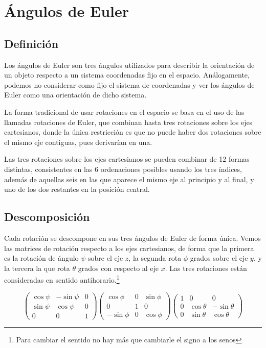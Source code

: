 \documentclass{article}
\theoremstyle{plain}
\theoremstyle{definition}
\theoremstyle{remark}
\begin{document}
\section{Ángulos de Euler}
\subsection{Definición}

Los ángulos de Euler son tres ángulos utilizados para describir la orientación de un objeto respecto a un sistema
coordenadas fijo en el espacio. Análogamente, podemos no considerar como fijo el sistema de coordenadas y ver
los ángulos de Euler como una orientación de dicho sistema.

La forma tradicional de usar rotaciones en el espacio se basa en el uso de las llamadas rotaciones de Euler,
que combinan hasta tres rotaciones sobre los ejes cartesianos, donde la única restricción es que no puede
haber dos rotaciones sobre el mismo eje contiguas, pues derivarían en una.

Las tres rotaciones sobre los ejes cartesianos se pueden combinar de 12 formas distintas, consistentes en
las 6 ordenaciones posibles usando los tres índices, además de aquellas seis en las que aparece el mismo
eje al principio y al final, y uno de los dos restantes en la posición central.


\subsection{Descomposición}
Cada rotación se descompone en sus tres ángulos de Euler de forma única. Vemos las matrices de rotación
respecto a los ejes cartesianos, de forma que la primera es la rotación de ángulo $\psi$ sobre el
eje $z$, la segunda rota $\phi$ grados sobre el eje $y$, y la tercera la que rota $\theta$ grados con respecto
al eje $x$. Las tres rotaciones están consideradas en sentido antihorario.\footnote{Para cambiar el sentido no hay más que cambiarle el signo a los senos}

\[\begin{pmatrix}
    \cos \psi & -\sin \psi & 0 \\
    \sin \psi & \cos \psi & 0 \\
    0 & 0 & 1
  \end{pmatrix}\begin{pmatrix}
      \cos \phi & 0 & \sin \phi \\
      0 & 1 & 0 \\
      -\sin \phi & 0 & \cos \phi
    \end{pmatrix}\begin{pmatrix}
    1 & 0 & 0 \\
    0 & \cos \theta & -\sin \theta \\
    0 & \sin \theta & \cos \theta
  \end{pmatrix}
\]
\end{document}
